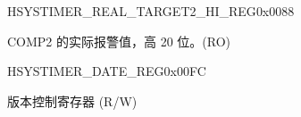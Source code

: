 \begin{register}{H}{SYSTIMER\_REAL\_TARGET2\_HI\_REG}{0x{}0088}\label{regdesc:SYSTIMERREALTARGET2HIREG}
%
%
\regnewline%
\begin{regdesc}\begin{reglist}
\label{fielddesc:SYSTIMERTARGET2HIRO}\item [SYSTIMER\_TARGET2\_HI\_RO] COMP2 的实际报警值，高 20 位。(RO)
\end{reglist}\end{regdesc}
\end{register}


\begin{register}{H}{SYSTIMER\_DATE\_REG}{0x{}00FC}\label{regdesc:SYSTIMERDATEREG}
%
\regnewline%
\begin{regdesc}\begin{reglist}
\label{fielddesc:SYSTIMERDATE}\item [SYSTIMER\_DATE] 版本控制寄存器 (R/W)
\end{reglist}\end{regdesc}
\end{register}


